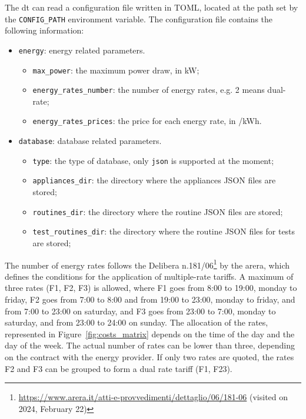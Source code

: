 The \acrshort{dt} can read a configuration file written in TOML, located at the path set by the \texttt{CONFIG\_PATH} environment variable. The configuration file contains the following information:
\begin{itemize}
    \item \texttt{energy}: energy related parameters.
          \begin{itemize}
              \item \texttt{max\_power}: the maximum power draw, in kW;
              \item \texttt{energy\_rates\_number}: the number of energy rates, e.g. 2 means dual-rate;
              \item \texttt{energy\_rates\_prices}: the price for each energy rate, in \texteuro/kWh.
          \end{itemize}
    \item \texttt{database}: database related parameters.
          \begin{itemize}
              \item \texttt{type}: the type of database, only \texttt{json} is supported at the moment;
              \item \texttt{appliances\_dir}: the directory where the appliances JSON files are stored;
              \item \texttt{routines\_dir}: the directory where the routine JSON files are stored;
              \item \texttt{test\_routines\_dir}: the directory where the routine JSON files for tests are stored;
          \end{itemize}
\end{itemize}

The number of energy rates follows the Delibera n.181/06\footnote{\url{https://www.arera.it/atti-e-provvedimenti/dettaglio/06/181-06} (visited on 2024, February 22)} by the \acrfull{arera}, which defines the conditions for the application of multiple-rate tariffs. A maximum of three rates (F1, F2, F3) is allowed, where F1 goes from 8:00 to 19:00, monday to friday, F2 goes from 7:00 to 8:00 and from 19:00 to 23:00, monday to friday, and from 7:00 to 23:00 on saturday, and F3 goes from 23:00 to 7:00, monday to saturday, and from 23:00 to 24:00 on sunday. The allocation of the rates, represented in Figure~\ref{fig:costs_matrix} depends on the time of the day and the day of the week. The actual number of rates can be lower than three, depending on the contract with the energy provider. If only two rates are quoted, the rates F2 and F3 can be grouped to form a dual rate tariff (F1, F23).

